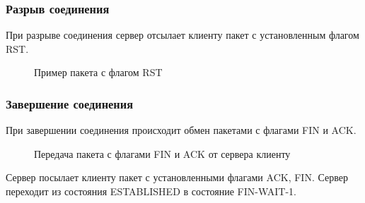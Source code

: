 \documentclass[a4paper, 14pt,russian]{article}
\begin{document}
		
	\subsubsection{Разрыв соединения}
		При разрыве соединения сервер отсылает клиенту пакет с установленным флагом RST.

		\begin{figure}[h!]
			\caption{Пример пакета с флагом RST}
			\label{img:tcp_reset}
		\end{figure}
	
	\subsubsection{Завершение соединения}
	При завершении соединения происходит обмен пакетами с флагами FIN и ACK.
	
	\newpage
	\begin{figure}[h!]
		\caption{Передача пакета с флагами FIN и ACK от сервера клиенту}
		\label{img:tcp_reset}
	\end{figure}
	Сервер посылает клиенту пакет с установленными флагами ACK, FIN. Сервер переходит из состояния ESTABLISHED в состояние FIN-WAIT-1.
\end{document}
